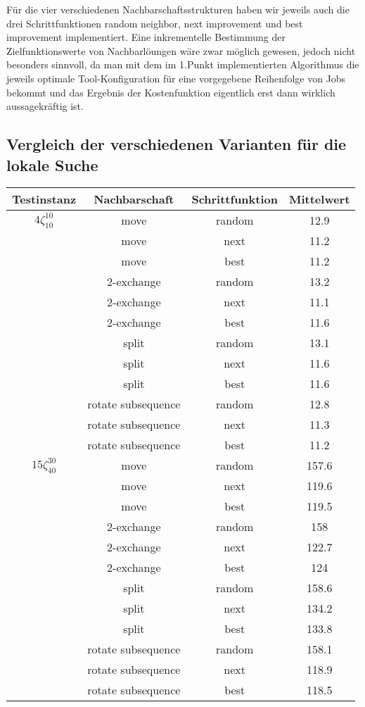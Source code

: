 \documentclass[a4paper,10pt]{article}
\begin{document}
F\"{u}r die vier verschiedenen Nachbarschaftsstrukturen haben wir jeweils auch die drei Schrittfunktionen random neighbor, next improvement und best improvement implementiert. Eine inkrementelle Bestimmung der Zielfunktionswerte von Nachbarl\"{o}ungen w\"{a}re zwar m\"{o}glich gewesen, jedoch nicht besonders sinnvoll, da man mit dem im 1.Punkt implementierten Algorithmus die jeweils optimale Tool-Konfiguration f\"{u}r eine vorgegebene Reihenfolge von Jobs bekommt und das Ergebnis der Kostenfunktion eigentlich erst dann wirklich aussagekr\"{a}ftig ist.

\subsection{Vergleich der verschiedenen Varianten f\"{u}r die lokale Suche}

\begin{tabular}{cccc}
\hline
Testinstanz & Nachbarschaft & Schrittfunktion & Mittelwert \\
\hline
$4\zeta_{10}^{10}$ & move & random &  12.9 \\
							 		& move & next &  11.2 \\
									& move & best &  11.2 \\
							 		& 2-exchange & random &  13.2 \\
							 		& 2-exchange & next &  11.1 \\
									& 2-exchange & best &  11.6 \\
							 		& split & random &  13.1 \\
							 		& split & next &  11.6 \\
									& split & best &  11.6 \\
							 		& rotate subsequence & random &  12.8 \\
							 		& rotate subsequence & next &  11.3 \\
									& rotate subsequence & best &  11.2 \\
\hline									
$15\zeta_{40}^{30}$ & move & random &  157.6 \\
							 		& move & next &  119.6 \\
									& move & best &  119.5 \\
							 		& 2-exchange & random &  158 \\
							 		& 2-exchange & next &  122.7 \\
									& 2-exchange & best &  124 \\
							 		& split & random &  158.6 \\
							 		& split & next &  134.2 \\
									& split & best &  133.8 \\
							 		& rotate subsequence & random &  158.1 \\
							 		& rotate subsequence & next &  118.9 \\
									& rotate subsequence & best &  118.5 \\
\hline									
\end{tabular}
\end{document}
